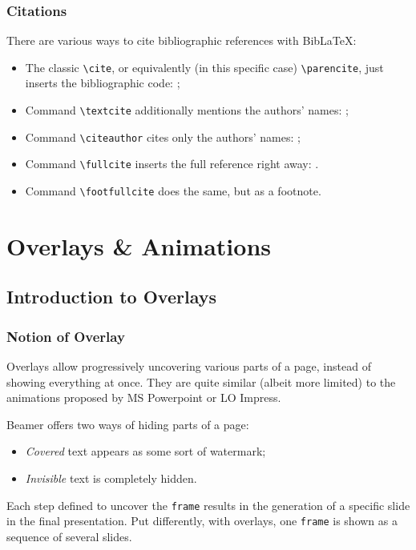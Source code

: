 \documentclass[10pt,    %
    english,            %
    xcolor=table,       %
    envcountsect,        %
    aspectratio=169     %
]{beamer}
\begin{document}
\begin{frame}
    \frametitle{Citations} 
    
    There are various ways to cite bibliographic references with BibLaTeX:
    \begin{itemize}
        \footnotesize
        \item The classic \texttt{\textbackslash{}cite}, or equivalently (in this specific case) \texttt{\textbackslash{}parencite}, just inserts the bibliographic code: \cite{Cossu2016};
        \item Command \texttt{\textbackslash{}textcite} additionally mentions the authors' names: \textcite{Cossu2016};
        \item Command \texttt{\textbackslash{}citeauthor} cites only the authors' names: \citeauthor{Cossu2016};
        \item Command \texttt{\textbackslash{}fullcite} inserts the full reference right away: .
        \item Command \texttt{\textbackslash{}footfullcite} does the same, but as a footnote.
    \end{itemize}
\end{frame}










\section{Overlays \& Animations}
\label{sec:animations}
\sectionframe

\subsection{Introduction to Overlays}
\begin{frame}
    \frametitle{Notion of Overlay}
    
    Overlays allow progressively uncovering various parts of a page, instead of showing everything at once. They are quite similar (albeit more limited) to the animations proposed by MS Powerpoint or LO Impress.
    
    \vspace{0.25cm}
    Beamer offers two ways of hiding parts of a page: 
    \begin{itemize}
        \item \textit{Covered} text appears as some sort of watermark;
        \item \textit{Invisible} text is completely hidden.
    \end{itemize}
    
    \vspace{0.25cm}
    Each step defined to uncover the \texttt{frame} results in the generation of a specific slide in the final presentation. Put differently, with overlays, one \texttt{frame} is shown as a sequence of several slides.
\end{frame}
\end{document}
